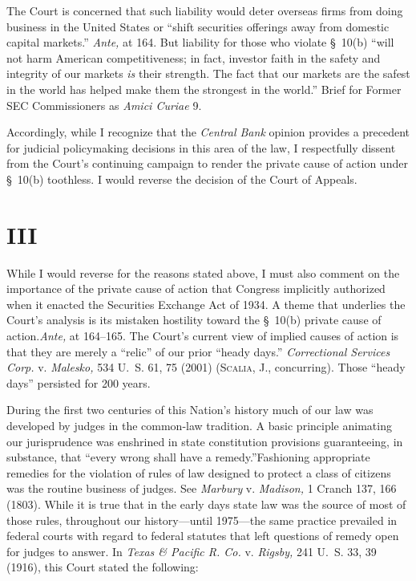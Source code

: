   The Court is concerned that such liability would deter overseas firms from doing business in the United States or ``shift securities offerings away from domestic capital markets.'' \emph{Ante,} at 164. But liability for those who violate \S~10(b) ``will not harm American competitiveness; in fact, investor faith in the safety and integrity of our markets \emph{is} their strength. The fact that our markets are the safest in the world has helped make them the strongest in the world.'' Brief for Former SEC Commissioners as \emph{Amici Curiae} 9.

  Accordingly, while I recognize that the \emph{Central Bank} opinion provides a precedent for judicial policymaking decisions in this area of the law, I respectfully dissent from the Court's continuing campaign to render the private cause of action under \S~10(b) toothless. I would reverse the decision of the Court of Appeals.

\section{III}

  While I would reverse for the reasons stated above, I must also comment on the importance of the private cause of action that Congress implicitly authorized when it enacted the Securities Exchange Act of 1934. A theme that underlies the Court's analysis is its mistaken hostility toward the \S~10(b) private cause of action.\footnotemark[11] \emph{Ante,} at 164--165. The Court's current view of implied causes of action is that they \newpage  are merely a ``relic'' of our prior ``heady days.'' \emph{Correctional Services Corp.} v. \emph{Malesko,} 534 U.~S. 61, 75 (2001) (\textsc{Scalia,} J., concurring). Those ``heady days'' persisted for 200 years.


  During the first two centuries of this Nation's history much of our law was developed by judges in the common-law tradition. A basic principle animating our jurisprudence was enshrined in state constitution provisions guaranteeing, in substance, that ``every wrong shall have a remedy.''\footnotemark[12] \newpage  Fashioning appropriate remedies for the violation of rules of law designed to protect a class of citizens was the routine business of judges. See \emph{Marbury} v. \emph{Madison,} 1 Cranch 137, 166 (1803). While it is true that in the early days state law was the source of most of those rules, throughout our history---until 1975---the same practice prevailed in federal courts with regard to federal statutes that left questions of remedy open for judges to answer. In \emph{Texas \& Pacific R. Co.} v. \emph{Rigsby,} 241 U.~S. 33, 39 (1916), this Court stated the following:

